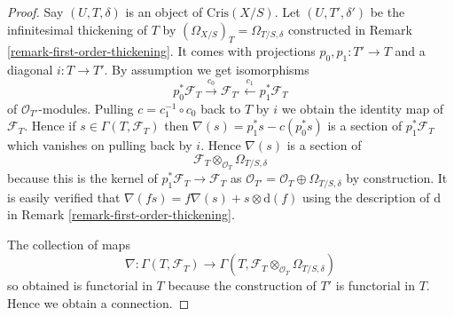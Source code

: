 \documentclass{amsart}
\theoremstyle{plain}
\theoremstyle{definition}
\theoremstyle{remark}
\numberwithin{equation}{subsection}
\begin{document}
\begin{proof}
Say $(U, T, \delta)$ is an object of $\text{Cris}(X/S)$.
Let $(U, T', \delta')$ be the infinitesimal thickening of $T$
by $(\Omega_{X/S})_T = \Omega_{T/S, \delta}$
constructed in Remark \ref{remark-first-order-thickening}.
It comes with projections $p_0, p_1 : T' \to T$
and a diagonal $i : T \to T'$. By assumption we get
isomorphisms
$$
p_0^*\mathcal{F}_T \xrightarrow{c_0}
\mathcal{F}_{T'} \xleftarrow{c_1}
p_1^*\mathcal{F}_T
$$
of $\mathcal{O}_{T'}$-modules. Pulling $c = c_1^{-1} \circ c_0$
back to $T$ by $i$ we obtain the identity map
of $\mathcal{F}_T$. Hence if $s \in \Gamma(T, \mathcal{F}_T)$
then $\nabla(s) = p_1^*s - c(p_0^*s)$ is a section of
$p_1^*\mathcal{F}_T$ which vanishes on pulling back by $i$. Hence
$\nabla(s)$ is a section of
$$
\mathcal{F}_T
\otimes_{\mathcal{O}_T}
\Omega_{T/S, \delta}
$$
because this is the kernel of $p_1^*\mathcal{F}_T \to \mathcal{F}_T$
as $\mathcal{O}_{T'} = \mathcal{O}_T \oplus \Omega_{T/S, \delta}$
by construction. It is easily verified that $\nabla(fs) =
f\nabla(s) + s \otimes \text{d}(f)$ using the description of
$\text{d}$ in Remark \ref{remark-first-order-thickening}.

\medskip\noindent
The collection of maps
$$
\nabla : \Gamma(T, \mathcal{F}_T) \to
\Gamma(T, \mathcal{F}_T \otimes_{\mathcal{O}_T} \Omega_{T/S, \delta})
$$
so obtained is functorial in $T$ because the construction of $T'$
is functorial in $T$. Hence we obtain a connection.


\end{proof}
\end{document}

